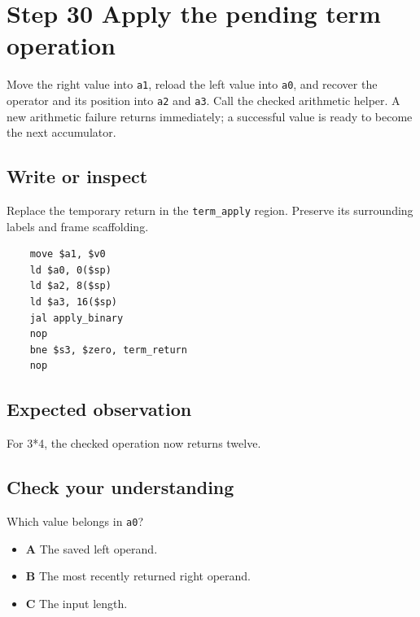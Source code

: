 \section{Step 30 Apply the pending term operation}\label{expression-s30}

Move the right value into \texttt{a1}, reload the left value into \texttt{a0}, and recover the operator and its position into \texttt{a2} and \texttt{a3}. Call the checked arithmetic helper. A new arithmetic failure returns immediately; a successful value is ready to become the next accumulator.

\subsection{Write or inspect}
Replace the temporary return in the \texttt{term\_apply} region. Preserve its surrounding labels and frame scaffolding.

\begin{verbatim}
    move $a1, $v0
    ld $a0, 0($sp)
    ld $a2, 8($sp)
    ld $a3, 16($sp)
    jal apply_binary
    nop
    bne $s3, $zero, term_return
    nop
\end{verbatim}
\subsection{Expected observation}
For 3*4, the checked operation now returns twelve.

\subsection{Check your understanding}
Which value belongs in \texttt{a0}?

\begin{itemize}
  \item \textbf{A} The saved left operand.
  \item \textbf{B} The most recently returned right operand.
  \item \textbf{C} The input length.
\end{itemize}
